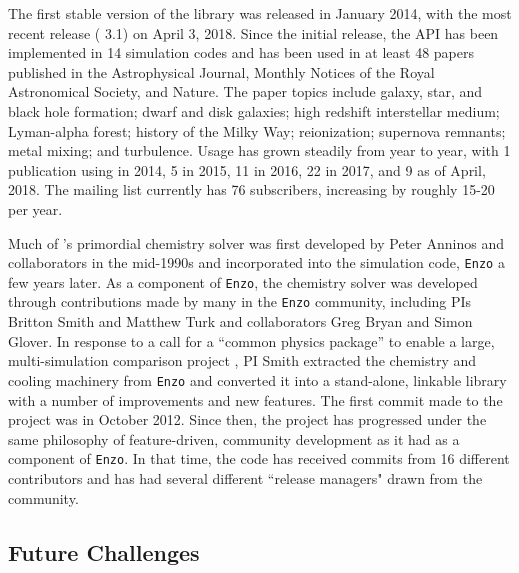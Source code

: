 The first stable version of the \grackle{} library was released in
January 2014, with the most recent release (\grackle{} 3.1) on April
3, 2018.  Since the initial release, the \grackle{} API has been
implemented in 14 simulation codes and has been used in at least 48 papers
published in the Astrophysical Journal, Monthly Notices of the Royal
Astronomical Society, and Nature.  The paper topics include galaxy,
star, and black hole formation; dwarf
and disk galaxies; high redshift interstellar medium; Lyman-alpha
forest; history of the Milky Way; reionization; supernova
remnants; metal mixing; and turbulence.  Usage has grown steadily
from year to year, with 1 publication using \grackle{} in 2014, 5 in
2015, 11 in 2016, 22 in 2017, and 9 as of April, 2018.  The
\grackle{} mailing list currently has 76 subscribers, increasing by
roughly 15-20 per year.

Much of \grackle{}'s primordial chemistry solver was first developed
by Peter Anninos and collaborators in the mid-1990s
\citep{1997NewA....2..209A, 1997NewA....2..181A} and incorporated into
the simulation code, \texttt{Enzo} \citep[][licensed under the
  3-clause, revised BSD license]{2014ApJS..211...19B} a few
years later.  As a component of \texttt{Enzo}, the chemistry solver
was developed through contributions made by many in the
\texttt{Enzo} community, including PIs Britton Smith and Matthew Turk
and collaborators Greg Bryan and Simon Glover.  In response to a call for
a ``common physics package'' to enable a large, multi-simulation
comparison project \citep[AGORA,][]{2014ApJS..210...14K,
  2016ApJ...833..202K}, PI Smith extracted the chemistry and
cooling machinery from \texttt{Enzo} and converted it into a
stand-alone, linkable library with a number of improvements
and new features.  The first commit made to the \grackle{}
project was in October 2012.  Since then, the project has progressed
under the same philosophy of feature-driven, community development as
it had as a component of \texttt{Enzo}.  In that time, the code has
received commits from 16 different contributors and has had several different
``release managers" drawn from the community.

\subsection{Future Challenges}

